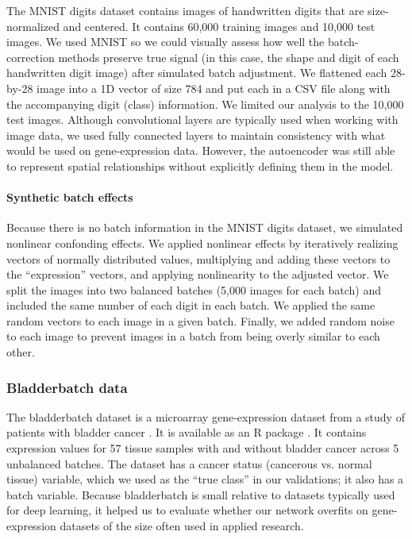 \documentclass[11pt]{article}
\begin{document}
The MNIST digits dataset \cite{lecun_mnist_nodate} contains images of handwritten digits that are size-normalized and centered.
It contains 60,000 training images and 10,000 test images.
We used MNIST so we could visually assess how well the batch-correction methods preserve true signal (in this case, the shape and digit of each handwritten digit image) after simulated batch adjustment.
We flattened each 28-by-28 image into a 1D vector of size 784 and put each in a CSV file along with the accompanying digit (class) information.
We limited our analysis to the 10,000 test images.
Although convolutional layers are typically used when working with image data, we used fully connected layers to maintain consistency with what would be used on gene-expression data.
However, the autoencoder was still able to represent spatial relationships without explicitly defining them in the model.

\paragraph{Synthetic batch effects}

Because there is no batch information in the MNIST digits dataset, we simulated nonlinear confonding effects.
We applied nonlinear effects by iteratively realizing vectors of normally distributed values, multiplying and adding these vectors to the ``expression'' vectors, and applying nonlinearity to the adjusted vector.
We split the images into two balanced batches (5,000 images for each batch) and included the same number of each digit in each batch.
We applied the same random vectors to each image in a given batch.
Finally, we added random noise to each image to prevent images in a batch from being overly similar to each other.

\subsubsection{Bladderbatch data}

The bladderbatch dataset is a microarray gene-expression dataset from a study of patients with bladder cancer \cite{dyrskjot_gene_2004}.
It is available as an R package \cite{leek_bladderbatch_2017}.
It contains expression values for 57 tissue samples with and without bladder cancer across 5 unbalanced batches.
The dataset has a cancer status (cancerous vs. normal tissue) variable, which we used as the ``true class'' in our validations; it also has a batch variable.
Because bladderbatch is small relative to datasets typically used for deep learning, it helped us to evaluate whether our network overfits on gene-expression datasets of the size often used in applied research.
\end{document}
